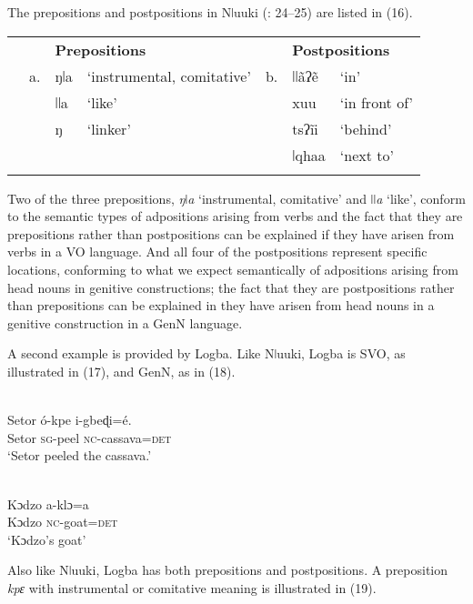 \documentclass[output=paper]{langsci/langscibook}
\begin{document}
The prepositions and postpositions in Nǀuuki (\citealt{CollinsNamaseb2011}: 24–25) are listed in (16).


\begin{table}
\begin{tabularx}{\textwidth}{XXXXXXX} 
\lsptoprule
&  & \multicolumn{2}{X}{\bfseries Prepositions} &  & \multicolumn{2}{X}{\bfseries Postpositions}\\
& a. & ŋǀa & ‘instrumental, comitative’ & b. & ǀǀãʔẽ & ‘in’\\
&  & ǀǀa & ‘like’ &  & xuu & ‘in front of’\\
&  & ŋ & ‘linker’ &  & tsʔĩi & ‘behind’\\
&  &  &  &  & ǀqhaa & ‘next to’\\
\lspbottomrule
\end{tabularx}
\end{table}

Two of the three prepositions, \textit{ŋǀa} ‘instrumental, comitative’ and \textit{ǀǀa} ‘like’, conform to the semantic types of adpositions arising from verbs and the fact that they are prepositions rather than postpositions can be explained if they have arisen from verbs in a VO language. And all four of the postpositions represent specific locations, conforming to what we expect semantically of adpositions arising from head nouns in genitive constructions; the fact that they are postpositions rather than prepositions can be explained in they have arisen from head nouns in a genitive construction in a GenN language.

A second example is provided by Logba. Like Nǀuuki, Logba is SVO, as illustrated in (17), and GenN, as in (18).

\ea\label{ex:dryer:}
\\
\gll Setor  ó-kpe  i-gbeɖi=é.\\
       Setor  \textsc{sg}{}-peel  \textsc{nc}{}-cassava=\textsc{det}\\
\glt   ‘Setor peeled the cassava.’ 
\z

\ea\label{ex:dryer:}
\\
\gll Kɔdzo    a-klɔ=a\\
       Kɔdzo    \textsc{nc}{}-goat=\textsc{det}\\
\glt   ‘Kɔdzo’s goat’ 
\z

Also like Nǀuuki, Logba has both prepositions and postpositions. A preposition \textit{kpɛ} with instrumental or comitative meaning is illustrated in (19).
\end{document}
